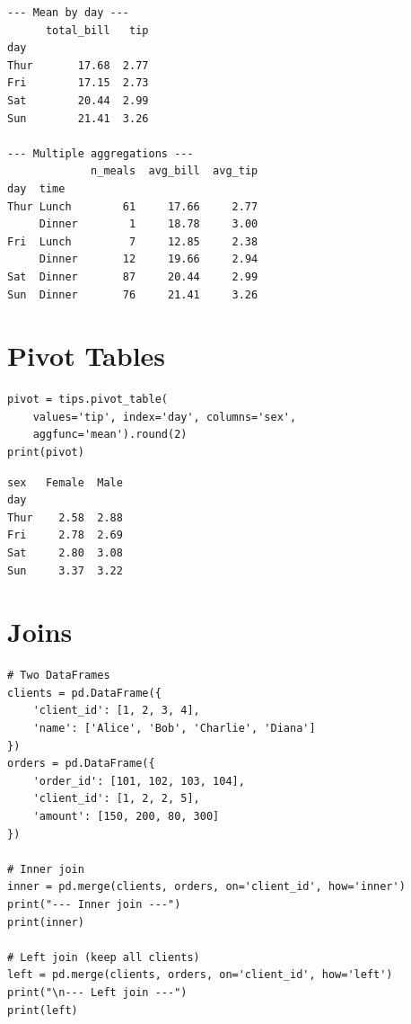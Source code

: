 \begin{codeoutput}
\begin{verbatim}
--- Mean by day ---
      total_bill   tip
day
Thur       17.68  2.77
Fri        17.15  2.73
Sat        20.44  2.99
Sun        21.41  3.26

--- Multiple aggregations ---
             n_meals  avg_bill  avg_tip
day  time
Thur Lunch        61     17.66     2.77
     Dinner        1     18.78     3.00
Fri  Lunch         7     12.85     2.38
     Dinner       12     19.66     2.94
Sat  Dinner       87     20.44     2.99
Sun  Dinner       76     21.41     3.26
\end{verbatim}
\end{codeoutput}

\section{Pivot Tables}

\begin{codeblock}[title=\textbf{Python --- pivot\_table}]
\begin{verbatim}
pivot = tips.pivot_table(
    values='tip', index='day', columns='sex',
    aggfunc='mean').round(2)
print(pivot)
\end{verbatim}
\end{codeblock}

\begin{codeoutput}
\begin{verbatim}
sex   Female  Male
day
Thur    2.58  2.88
Fri     2.78  2.69
Sat     2.80  3.08
Sun     3.37  3.22
\end{verbatim}
\end{codeoutput}

\section{Joins}

\begin{codeblock}[title=\textbf{Python --- merge}]
\begin{verbatim}
# Two DataFrames
clients = pd.DataFrame({
    'client_id': [1, 2, 3, 4],
    'name': ['Alice', 'Bob', 'Charlie', 'Diana']
})
orders = pd.DataFrame({
    'order_id': [101, 102, 103, 104],
    'client_id': [1, 2, 2, 5],
    'amount': [150, 200, 80, 300]
})

# Inner join
inner = pd.merge(clients, orders, on='client_id', how='inner')
print("--- Inner join ---")
print(inner)

# Left join (keep all clients)
left = pd.merge(clients, orders, on='client_id', how='left')
print("\n--- Left join ---")
print(left)
\end{verbatim}
\end{codeblock}

